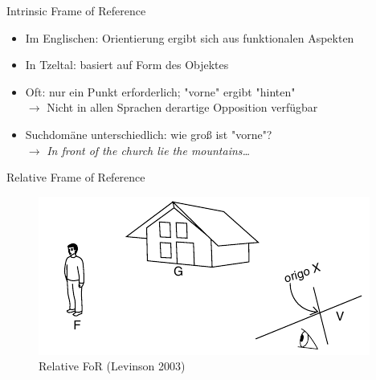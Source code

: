 \documentclass[12pt,a4paper]{beamer}
\begin{document}
\begin{frame}{Intrinsic Frame of Reference}
\begin{itemize}
\item Im Englischen: Orientierung ergibt sich aus funktionalen Aspekten
\item In Tzeltal: basiert auf Form des Objektes
\item Oft: nur ein Punkt erforderlich; "vorne" ergibt "hinten" \\
$\to$ Nicht in allen Sprachen derartige Opposition verfügbar
\item Suchdomäne unterschiedlich: wie groß ist "vorne"? \\
$\to$ \textit{In front of the church lie the mountains\ldots}
\end{itemize}
\end{frame}


\begin{frame}{Relative Frame of Reference}
\begin{figure}
\includegraphics[scale=0.45]{img/levinson_FOR_relative.png}
\caption{Relative FoR (Levinson 2003)}
\end{figure}
\end{frame}
\end{document}
